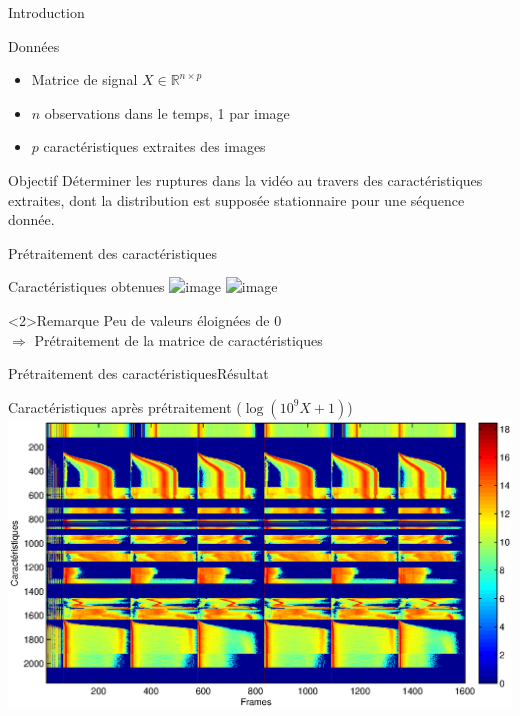 \begin{frame}{Introduction}

\begin{exampleblock}{Données}
\begin{itemize}
\item Matrice de signal $X \in \mathbb{R}^{n \times p}$
\item $n$ observations dans le temps, 1 par image
\item $p$ caractéristiques extraites des images
\end{itemize}
\end{exampleblock}

\begin{block}{Objectif}
Déterminer les ruptures dans la vidéo au travers des caractéristiques extraites, dont la distribution est supposée stationnaire pour une séquence donnée.
\end{block}

\end{frame}

\begin{frame}{Prétraitement des caractéristiques}

{
\begin{exampleblock}{Caractéristiques obtenues}
\centering
\includegraphics<1>[width=\textwidth]{images/signal}
\includegraphics<2>[width=.6\textwidth]{images/signal}
\end{exampleblock}
}

\begin{alertblock}<2>{Remarque}
	Peu de valeurs éloignées de 0 \\
	$\Rightarrow$ Prétraitement de la matrice de caractéristiques
\end{alertblock}
\end{frame}

\begin{frame}{Prétraitement des caractéristiques}{Résultat}

{
\begin{exampleblock}{Caractéristiques après prétraitement ($\log (10^9 X + 1)$)}
\centering
\includegraphics[width=\textwidth]{images/signalPreprocessed}
\end{exampleblock}
}

\end{frame}


